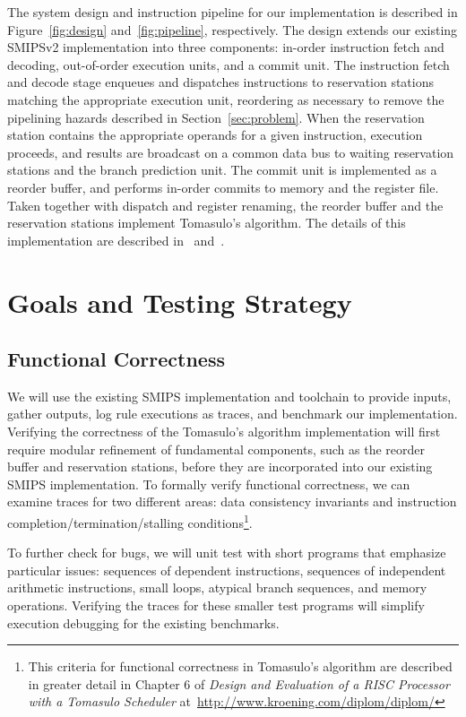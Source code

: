 \documentclass[12pt]{article}
\begin{document}
The system design and instruction pipeline for our implementation is described
in Figure~\ref{fig:design} and~\ref{fig:pipeline}, respectively. 
The design extends our existing SMIPSv2 
implementation into three components: in-order instruction fetch and decoding, 
out-of-order execution units, and a commit unit. The instruction fetch and 
decode stage enqueues and dispatches instructions to reservation stations 
matching the appropriate execution unit, reordering as necessary to remove the 
pipelining hazards described in Section~\ref{sec:problem}. When the reservation 
station contains the appropriate operands for a given instruction, execution 
proceeds, and results are broadcast on a common data bus to waiting reservation 
stations and the branch prediction unit. The commit unit is implemented as a 
reorder buffer, and performs in-order commits to memory and the register file. 
Taken together with dispatch and register renaming, the reorder buffer and the 
reservation stations implement Tomasulo's algorithm. The details of this implementation 
are described in~\cite{99KMP} and~\cite{0023143}.

\section{Goals and Testing Strategy}

\subsection{Functional Correctness}

We will use the existing SMIPS implementation and toolchain to provide inputs, gather 
outputs, log rule executions as traces, and benchmark our implementation. Verifying the 
correctness of the Tomasulo's algorithm implementation will first require modular refinement
of fundamental components, such as the reorder buffer and reservation stations, before 
they are incorporated into our existing SMIPS implementation. To formally verify functional correctness,
we can examine traces for two different areas: data consistency invariants and instruction 
completion/termination/stalling conditions\footnote{This criteria for functional correctness in Tomasulo's
algorithm are described in greater detail in Chapter 6 of 
\emph{Design and Evaluation of a RISC Processor with a Tomasulo Scheduler} at~\url{http://www.kroening.com/diplom/diplom/}}.  

To further check for bugs, we will unit test with short programs that 
emphasize particular issues: sequences of dependent instructions, sequences of independent
arithmetic instructions, small loops, atypical branch sequences, and memory operations. 
Verifying the traces for these smaller test programs will simplify execution debugging 
for the existing benchmarks.
\end{document}
